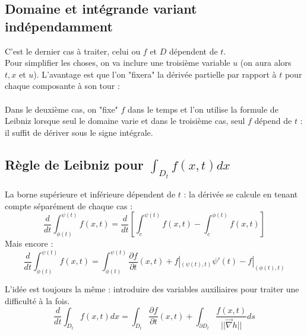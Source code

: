 \documentclass[11pt, a4paper, openany]{book}
\begin{document}
		\subsection{Domaine et intégrande variant indépendamment}
		C'est le dernier cas à traiter, celui ou $f$ et $D$ dépendent de $t$.\\
		Pour simplifier les choses, on va inclure une troisième variable $u$ (on aura alors $t, x$ et $u$). L'avantage est que l'on "fixera" la dérivée partielle par rapport à $t$ pour chaque composante à son tour :\\
									
		\ \\
									
		Dans le deuxième cas, on "fixe" $f$ dans le temps et l'on utilise la formule de Leibniz lorsque seul le domaine varie et dans le troisième cas, seul $f$ dépend de $t$ : il suffit de dériver sous le signe intégrale.
									
		\subsection{Règle de Leibniz pour $\int_{D_t} f(x,t) dx$}
		La borne supérieure et inférieure dépendent de $t$ : la dérivée se calcule en tenant compte séparément de chaque cas :
		\begin{equation}
			\frac{d}{dt}\int_{\phi(t)}^{\psi(t)} f(x,t) =  \frac{d}{dt}\left[\int_c^{\psi(t)}f(x,t) - \int_c^{\phi(t)}f(x,t)\right]
		\end{equation}
		Mais encore :
		\begin{equation}
			\frac{d}{dt}\int_{\phi(t)}^{\psi(t)} f(x,t) = \int_{\phi(t)}^{\psi(t)} \frac{\partial f}{\partial t}(x,t) + f|_{(\psi(t),t)} \psi'(t) - f|_{(\phi(t), t)}
		\end{equation}
									
		L'idée est toujours la même : introduire des variables auxiliaires pour traiter une difficulté à la fois.
		\begin{equation}
			\frac{d}{dt}\int_{D_t} f(x,t) dx = \int_{D_t} \frac{\partial f}{\partial t}(x,t) + \int_{\partial D_t} \frac{f(x,t)}{||\vec{\nabla}h||}ds
		\end{equation}
									
\end{document}
